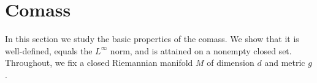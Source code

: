 \documentclass[reqno,11pt]{amsart}
\newcommand*\dif{\mathop{}\!\mathrm{d}}
\newcommand{\cpt}{\mathrm{cpt}}
\newtheorem{corollary}[theorem]{Corollary}
\theoremstyle{definition}
\numberwithin{equation}{section}
\begin{document}




\section{Comass}
In this section we study the basic properties of the comass.
We show that it is well-defined, equals the $L^\infty$ norm, and is attained on a nonempty closed set.
Throughout, we fix a closed Riemannian manifold $M$ of dimension $d$ and metric $g$.
\end{document}
